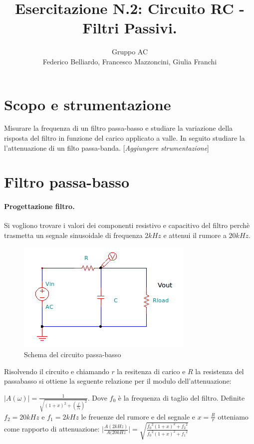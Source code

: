 \documentclass[10pt,a4paper]{article}
\author{Gruppo AC \\ Federico Belliardo, Francesco Mazzoncini, Giulia Franchi}
\title{Esercitazione N.2: Circuito RC - Filtri Passivi.}
\newcommand{\rem}[1]{[\emph{#1}]}
\begin{document}
\maketitle

\section{Scopo e strumentazione}

Misurare la frequenza di un filtro passa-basso e studiare la variazione della risposta del filtro in funzione del carico applicato a valle. In seguito studiare la l'attenuazione di un filto passa-banda.
\rem{Aggiungere strumentazione}

\section{Filtro passa-basso}

\paragraph{Progettazione filtro.}
Si vogliono trovare i valori dei componenti resistivo e capacitivo del filtro perchè trasmetta un segnale sinusoidale di frequenza $2kHz$ e attenui il rumore a $20kHz$.

\begin{figure}[h]
\centering
\includegraphics[scale=1.0]{passabasso.png}
\caption{Schema del circuito passa-basso}
\end{figure}

Risolvendo il circuito e chiamando $r$ la resitenza di carico e $R$ la resistenza del passabasso si ottiene la seguente relazione per il modulo dell'attenuazione:

$\vert A(\omega) \vert = \frac{1}{\sqrt{(1+x)^2+(\frac{f}{f_{0}})^2}} $. Dove $f_0$ è la frequenza di taglio del filtro. Definite $f_2 = 20 kHz$ e $f_1 = 2 kHz$ le freuenze del rumore e del segnale e $x = \frac {R}{r}$ otteniamo come rapporto di attenuazione: 
$\vert \frac{A(2 kHz)}{A(20 kHz} \vert = \sqrt{\frac{{f_0}^2 (1+x)^2 + {f_2}^2}{{f_0}^2 (1+x)^2 + {f_1}^2}}$
\end{document}
